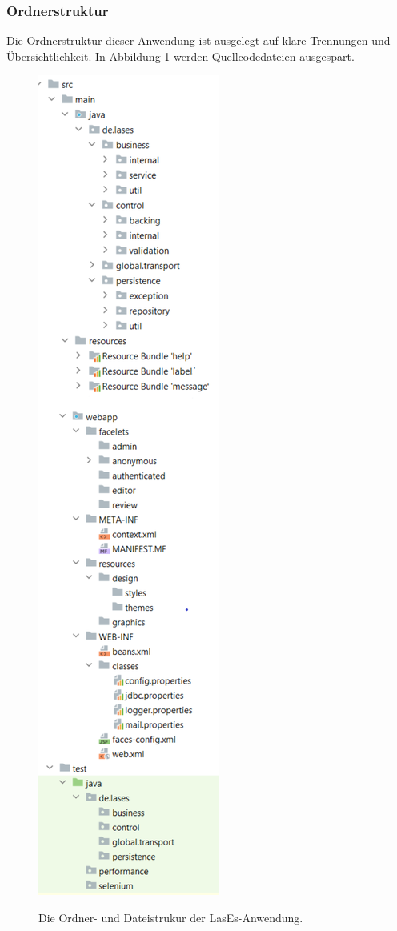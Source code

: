 \subsubsection{Ordnerstruktur}

Die Ordnerstruktur dieser Anwendung ist ausgelegt auf klare Trennungen und Übersichtlichkeit.
In \hyperref[feinarch:orddia]{Abbildung 1} werden Quellcodedateien ausgespart.

\begin{figure}[H]
    \centering
    \includegraphics[width=0.8\linewidth]{graphics/folder_structure2.0}\label{feinarch:orddia}
    \caption{Die Ordner- und Dateistrukur der LasEs-Anwendung.}
\end{figure}

